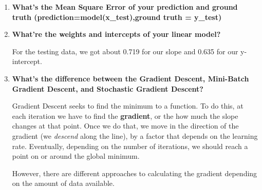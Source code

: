 \documentclass{article}
\begin{document}
\begin{enumerate}
\begin{figure}[!ht]
\begin{subfigure}{0.4\linewidth}
					\end{subfigure}
				\end{figure}

		\item \textbf{What's the Mean Square Error of your prediction and ground truth
				(prediction=model(x\_test),ground truth = y\_test)}

		\item \textbf{What're the weights and intercepts of your linear model?}

				For the testing data, we got about 0.719 for our slope and 0.635 for our 
				y-intercept.

		\item \textbf{What's the difference between the Gradient Descent, Mini-Batch Gradient
				Descent, and Stochastic Gradient Descent?}
				
				Gradient Descent seeks to find the minimum to a function. To do this, at each 
				iteration we have to find the \textbf{gradient}, or the how much the slope changes
				at that point. Once we do that, we move in the direction of the gradient (we 
				\textit{descend} along the line), by a factor that depends on the learning rate.
				Eventually, depending on the number of iterations, we should reach a point 
				on or around the global minimum.

				However, there are different approaches to calculating the gradient depending 
				on the amount of data available.


\end{enumerate}
\end{document}
